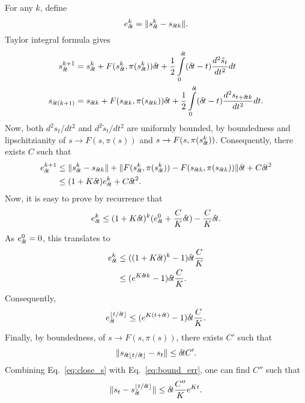 For any $k$, define
\begin{equation}
	e_{\delta\hspace{-.1em}t}^k = \|s_{\delta\hspace{-.1em}t}^k - s_{{\delta\hspace{-.1em}t} k}\|.
\end{equation}
Taylor integral formula gives
\begin{align}
	s_{\delta\hspace{-.1em}t}^{k + 1} &= s_{\delta\hspace{-.1em}t}^k + F(s_{\delta\hspace{-.1em}t}^k, \pi(s_{\delta\hspace{-.1em}t}^k)) {\delta\hspace{-.1em}t} +
	\frac{1}{2}\int\limits_{0}^{\delta\hspace{-.1em}t} ({\delta\hspace{-.1em}t} - t) \frac{d^2 \tilde{s}_t}{dt^2} dt\\
	s_{{\delta\hspace{-.1em}t}(k + 1)} &= s_{{\delta\hspace{-.1em}t} k} + F(s_{{\delta\hspace{-.1em}t} k}, \pi(s_{{\delta\hspace{-.1em}t} k})) {\delta\hspace{-.1em}t} +
	\frac{1}{2}\int\limits_0^{\delta\hspace{-.1em}t} ({\delta\hspace{-.1em}t} - t) \frac{d^2 s_{t + {\delta\hspace{-.1em}t} k}}{dt^2} dt.
\end{align}
Now, both $d^2 s_t/dt^2$ and $d^2 \tilde{s}_t/dt^2$ are uniformly bounded, by
boundedness and lipschitzianity of $s \rightarrow F(s, \pi(s))$ and $s
\rightarrow F(s, \pi(s_{\delta\hspace{-.1em}t}^k))$. Consequently, there exists $C$ such that
\begin{align}
	e_{\delta\hspace{-.1em}t}^{k + 1} &\leq \|s_{\delta\hspace{-.1em}t}^k - s_{{\delta\hspace{-.1em}t} k}\| + \|F(s_{\delta\hspace{-.1em}t}^k, \pi(s_{\delta\hspace{-.1em}t}^k)) - F(s_{{\delta\hspace{-.1em}t} k}, \pi(s_{{\delta\hspace{-.1em}t} k}))\| {\delta\hspace{-.1em}t} + C {\delta\hspace{-.1em}t}^2\\
			  &\leq (1 + K {\delta\hspace{-.1em}t}) e_{\delta\hspace{-.1em}t}^k + C {\delta\hspace{-.1em}t}^2.
\end{align}
Now, it is easy to prove by recurrence that
\begin{equation}
	e_{\delta\hspace{-.1em}t}^k \leq (1 + K {\delta\hspace{-.1em}t})^k (e_{\delta\hspace{-.1em}t}^0 + \frac{C}{K} {\delta\hspace{-.1em}t}) - \frac{C}{K}{\delta\hspace{-.1em}t}.
\end{equation}
As $e_{\delta\hspace{-.1em}t}^0 = 0$, this translates to
\begin{align}
	e_{\delta\hspace{-.1em}t}^k &\leq ((1 + K {\delta\hspace{-.1em}t})^k - 1) {\delta\hspace{-.1em}t} \frac{C}{K}\\
		    &\leq (e^{K {\delta\hspace{-.1em}t} k} - 1) {\delta\hspace{-.1em}t} \frac{C}{K}.
\end{align}
Consequently,
\begin{equation}
	e_{\delta\hspace{-.1em}t}^{\lfloor t / {\delta\hspace{-.1em}t} \rfloor} \leq (e^{K(t + {\delta\hspace{-.1em}t})} - 1) {\delta\hspace{-.1em}t} \frac{C}{K}.
	\label{eq:bound_err}
\end{equation}
Finally, by boundedness, of $s \rightarrow F(s, \pi(s))$, there exists $C'$ such that
\begin{equation}
	\|s_{{\delta\hspace{-.1em}t}\lfloor t / {\delta\hspace{-.1em}t} \rfloor} - s_t \| \leq {\delta\hspace{-.1em}t} C'.
	\label{eq:close_s}
\end{equation}
Combining Eq.~\eqref{eq:close_s} with Eq.~\eqref{eq:bound_err}, one can find $C''$ such that
\begin{equation}
	\|s_t - s_{\delta\hspace{-.1em}t}^{\lfloor t / {\delta\hspace{-.1em}t} \rfloor}\| \leq {\delta\hspace{-.1em}t} \frac{C''}{K} e^{Kt}.
\end{equation}
